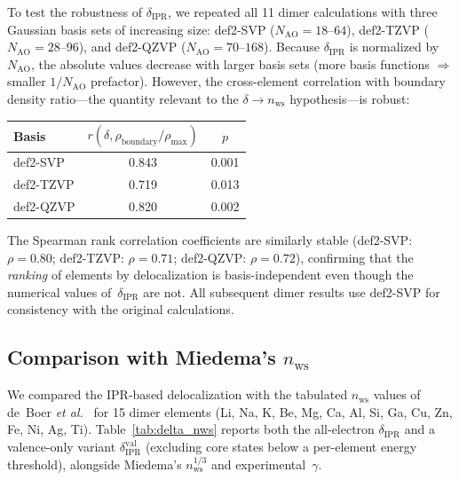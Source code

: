 \documentclass[twocolumn,showpacs,preprintnumbers,amsmath,amssymb,prb]{revtex4-2}
\begin{document}
To test the robustness of $\delta_\mathrm{IPR}$, we repeated
all 11 dimer calculations with three Gaussian basis sets
of increasing size:
def2-SVP ($N_\mathrm{AO} = 18$--$64$),
def2-TZVP ($N_\mathrm{AO} = 28$--$96$), and
def2-QZVP ($N_\mathrm{AO} = 70$--$168$).
Because $\delta_\mathrm{IPR}$ is normalized by $N_\mathrm{AO}$,
the absolute values decrease with larger basis sets
(more basis functions $\Rightarrow$ smaller
$1/N_\mathrm{AO}$ prefactor).
However, the cross-element correlation with boundary density
ratio---the quantity relevant to the $\delta \to n_\mathrm{ws}$
hypothesis---is robust:
\begin{center}
\begin{tabular}{lcc}
  Basis & $r(\delta, \rho_\mathrm{boundary}/\rho_\mathrm{max})$ & $p$ \\
  \hline
  def2-SVP  & 0.843 & 0.001 \\
  def2-TZVP & 0.719 & 0.013 \\
  def2-QZVP & 0.820 & 0.002 \\
\end{tabular}
\end{center}
The Spearman rank correlation coefficients are similarly stable
(def2-SVP: $\rho = 0.80$; def2-TZVP: $\rho = 0.71$;
def2-QZVP: $\rho = 0.72$), confirming that the
\emph{ranking} of elements by delocalization is
basis-independent even though the numerical values
of~$\delta_\mathrm{IPR}$ are not.
All subsequent dimer results use def2-SVP for consistency
with the original calculations.

\subsection{Comparison with Miedema's $n_\mathrm{ws}$}

We compared the IPR-based delocalization with the tabulated
$n_\mathrm{ws}$ values of de~Boer \textit{et al.}~\cite{deBoer1988}
for 15 dimer elements
(Li, Na, K, Be, Mg, Ca, Al, Si, Ga, Cu, Zn, Fe, Ni, Ag, Ti).
Table~\ref{tab:delta_nws} reports both the all-electron
$\delta_\mathrm{IPR}$ and a valence-only variant
$\delta_\mathrm{IPR}^\mathrm{val}$ (excluding core states
below a per-element energy threshold),
alongside Miedema's $n_\mathrm{ws}^{1/3}$ and
experimental~$\gamma$.
\end{document}

